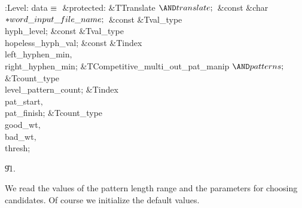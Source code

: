 \Y\B\4:Level: data\X${}\equiv{}$\6
\4\&{protected}:\6
\&{TTranslate} ${}{\AND}\\{translate};{}$\6
\&{const} \&{char} ${}{*}\\{word\_input\_file\_name};{}$\6
\&{const} \&{Tval\_type} \\{hyph\_level};\6
\&{const} \&{Tval\_type} \\{hopeless\_hyph\_val};\6
\&{const} \&{Tindex} \\{left\_hyphen\_min}${},{}$ \\{right\_hyphen\_min};\6
\&{TCompetitive\_multi\_out\_pat\_manip} ${}{\AND}\\{patterns};{}$\6
\&{Tcount\_type} \\{level\_pattern\_count};\6
\&{Tindex} \\{pat\_start}${},{}$ \\{pat\_finish};\6
\&{Tcount\_type} \\{good\_wt}${},{}$ \\{bad\_wt}${},{}$ \\{thresh};\par
\U91.\fi

We read the values of the pattern length range and the parameters for
choosing candidates. Of course we initialize the default values.

